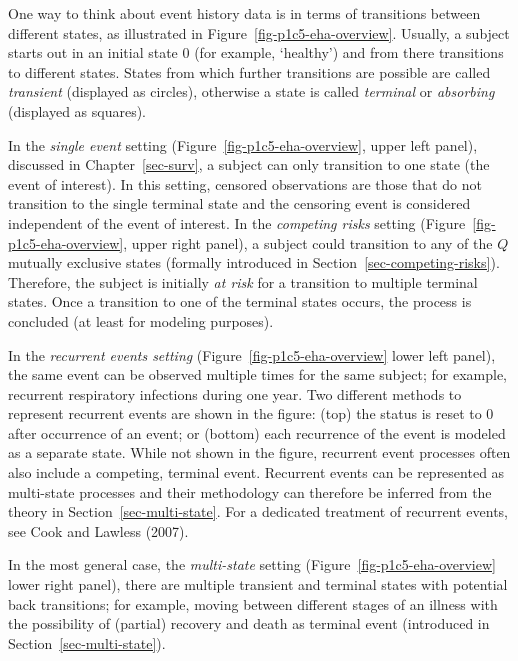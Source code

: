 \documentclass[
  letterpaper,
  krantz2]{style/krantz}
\begin{document}
One way to think about event history data is in terms of transitions
between different states, as illustrated in
Figure~\ref{fig-p1c5-eha-overview}. Usually, a subject starts out in an
initial state \(0\) (for example, `healthy') and from there transitions
to different states. States from which further
transitions are possible are called \emph{transient} (displayed as
circles), otherwise a state is called \emph{terminal} or
\emph{absorbing} (displayed as
squares).

In the \emph{single event} setting (Figure~\ref{fig-p1c5-eha-overview},
upper left panel), discussed in Chapter~\ref{sec-surv}, a subject can
only transition to one state (the event of interest). In this setting,
censored observations are those that do not transition to the single
terminal state and the censoring event is considered independent of the
event of interest. In the \emph{competing risks}
setting (Figure~\ref{fig-p1c5-eha-overview}, upper right panel), a
subject could transition to any of the \(Q\) mutually exclusive states
(formally introduced in Section~\ref{sec-competing-risks}). Therefore,
the subject is initially \emph{at risk} for a transition to multiple
terminal states. Once a transition to one of the terminal states occurs,
the process is concluded (at least for modeling purposes).

In the \emph{recurrent events setting}
(Figure~\ref{fig-p1c5-eha-overview} lower left panel), the same event
can be observed multiple times for the same subject; for example,
recurrent respiratory infections during one year. Two different methods
to represent recurrent events are shown in the figure: (top) the status
is reset to \(0\) after occurrence of an event; or (bottom) each
recurrence of the event is modeled as a separate state. While not shown
in the figure, recurrent event processes often also include a competing,
terminal event. Recurrent events can be represented as multi-state
processes and their methodology can therefore be inferred from the
theory in Section~\ref{sec-multi-state}. For a dedicated treatment of
recurrent events, see Cook and Lawless (2007).

In the most general case, the
\emph{multi-state} setting
(Figure~\ref{fig-p1c5-eha-overview} lower right panel), there are
multiple transient and terminal
states with potential
back transitions; for example, moving between different stages of an
illness with the possibility of (partial) recovery and death as terminal
event (introduced in Section~\ref{sec-multi-state}).
\end{document}
